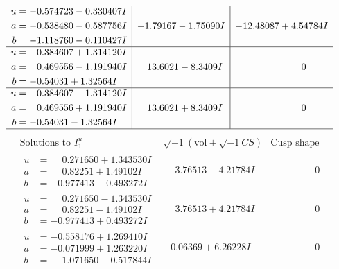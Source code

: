 \documentclass[1p]{elsarticle_modified}
\theoremstyle{definition}
\newcommand{\I}{\sqrt{-1}}
\begin{document}
$$\begin{array}{c|c|c}
\begin{aligned}
u &= -0.574723 - 0.330407 I \\
a &= -0.538480 - 0.587756 I \\
b &= -1.118760 - 0.110427 I\end{aligned}
 & -1.79167 - 1.75090 I & -12.48087 + 4.54784 I \\ \hline\begin{aligned}
u &= \phantom{-}0.384607 + 1.314120 I \\
a &= \phantom{-}0.469556 - 1.191940 I \\
b &= -0.54031 + 1.32564 I\end{aligned}
 & \phantom{-}13.6021 - 8.3409 I & \phantom{-0.000000 } 0 \\ \hline\begin{aligned}
u &= \phantom{-}0.384607 - 1.314120 I \\
a &= \phantom{-}0.469556 + 1.191940 I \\
b &= -0.54031 - 1.32564 I\end{aligned}
 & \phantom{-}13.6021 + 8.3409 I & \phantom{-0.000000 } 0\\
 \hline 
 \end{array}$$\newpage$$\begin{array}{c|c|c}  
\text{Solutions to }I^u_{1}& \I (\text{vol} + \sqrt{-1}CS) & \text{Cusp shape}\\
 \hline 
\begin{aligned}
u &= \phantom{-}0.271650 + 1.343530 I \\
a &= \phantom{-}0.82251 + 1.49102 I \\
b &= -0.977413 - 0.493272 I\end{aligned}
 & \phantom{-}3.76513 - 4.21784 I & \phantom{-0.000000 } 0 \\ \hline\begin{aligned}
u &= \phantom{-}0.271650 - 1.343530 I \\
a &= \phantom{-}0.82251 - 1.49102 I \\
b &= -0.977413 + 0.493272 I\end{aligned}
 & \phantom{-}3.76513 + 4.21784 I & \phantom{-0.000000 } 0 \\ \hline\begin{aligned}
u &= -0.558176 + 1.269410 I \\
a &= -0.071999 + 1.263220 I \\
b &= \phantom{-}1.071650 - 0.517844 I\end{aligned}
 & -0.06369 + 6.26228 I & \phantom{-0.000000 } 0 \\ \hline\begin{aligned}

\end{aligned}
\end{array}$$
\end{document}
